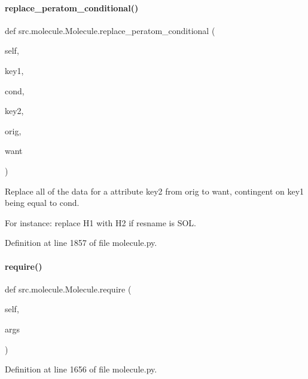\paragraph{\texorpdfstring{replace\+\_\+peratom\+\_\+conditional()}{replace\_peratom\_conditional()}}
{\footnotesize\ttfamily def src.\+molecule.\+Molecule.\+replace\+\_\+peratom\+\_\+conditional (\begin{DoxyParamCaption}\item[{}]{self,  }\item[{}]{key1,  }\item[{}]{cond,  }\item[{}]{key2,  }\item[{}]{orig,  }\item[{}]{want }\end{DoxyParamCaption})}



Replace all of the data for a attribute key2 from orig to want, contingent on key1 being equal to cond. 

For instance\+: replace H1 with H2 if resname is S\+OL. 

Definition at line 1857 of file molecule.\+py.

\mbox{\label{classsrc_1_1molecule_1_1Molecule_a5e74901959a8b939fc5a6c851e64d4ae}} 
\paragraph{\texorpdfstring{require()}{require()}}
{\footnotesize\ttfamily def src.\+molecule.\+Molecule.\+require (\begin{DoxyParamCaption}\item[{}]{self,  }\item[{}]{args }\end{DoxyParamCaption})}



Definition at line 1656 of file molecule.\+py.

\mbox{\label{classsrc_1_1molecule_1_1Molecule_ab72729cb3e6b2ed086669142c1409ed4}} 
